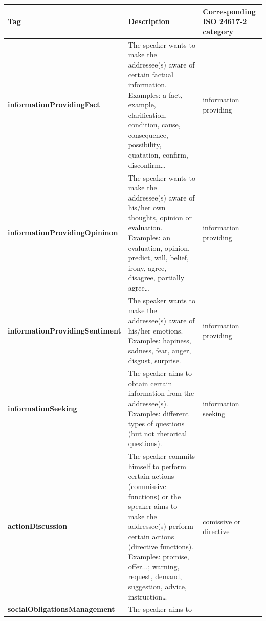 \documentclass[a4paper,oneside,12pt]{article}
\begin{document}
\begin{longtable}{|l|p{6cm}|p{4cm}|}
  \hline\textbf{Tag}                                   & \textbf{Description}           &
  \textbf{Corresponding
  ISO 24617-2 category}                                                                   \\
  \hline
  \endhead
  \textbf{informationProvidingFact}                    & {The speaker wants to
      make the addressee(s) aware of certain factual information.
      Examples: a fact, example, clarification, condition, cause,
      consequence, possibility, quatation, confirm, disconfirm…}
                                                       & {information providing}          \\
  \hline
  \textbf{informationProvidingOpininon}                & {The speaker wants to
      make the addressee(s) aware of his/her own thoughts,
      opinion or evaluation. Examples: an evaluation, opinion,
      predict, will, belief, irony, agree, disagree, partially
  agree…}                                              & {information
  providing}                                                                              \\
  \hline
  \textbf{informationProvidingSentiment}               & {The speaker wants to
      make the addressee(s) aware of his/her emotions. Examples:
      hapiness, sadness, fear, anger, disgust, surprise.}
                                                       & {information providing}          \\
  \hline
  \textbf{informationSeeking}                          & {The speaker aims to
      obtain certain information from the addressee(s). Examples:
      different types of questions (but not rhetorical
  questions).}                                         & {information
  seeking}                                                                                \\
  \hline
  \textbf{actionDiscussion}                            & {The speaker commits
      himself to perform certain actions (commissive functions)
      or the speaker aims to make the addressee(s) perform
      certain actions (directive functions). Examples: promise,
      offer...; warning, request, demand, suggestion, advice,
  instruction…}                                        & {comissive or
  directive}                                                                              \\
  \hline
  \textbf{socialObligationsManagement}                 & {The speaker aims to
}
\end{longtable}
\end{document}
